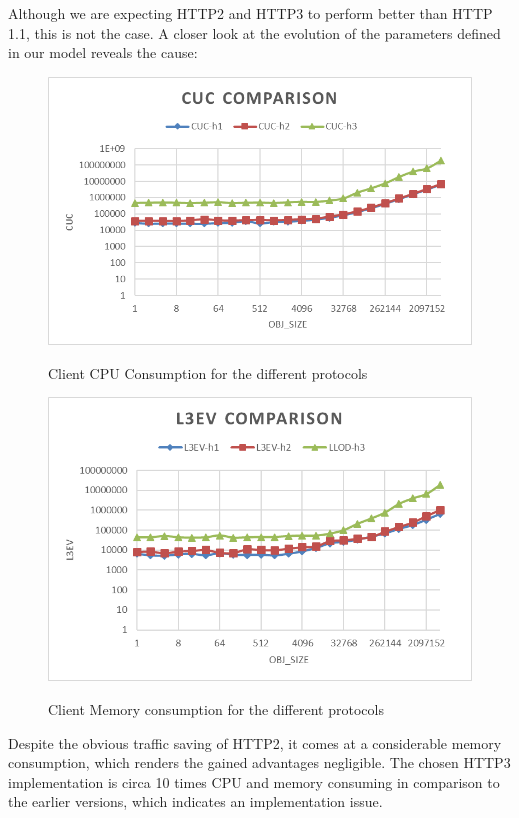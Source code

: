 \documentclass[runningheads]{llncs}
\begin{document}
Although we are expecting HTTP2 and HTTP3 to perform better than HTTP 1.1, this is not the case. A closer look at the evolution of the parameters defined in our model reveals the cause:
\begin{figure}
    \centering
    \begin{minipage}{0.49\textwidth}
        \centering
        \includegraphics[width=1\textwidth]{cuc-h2load-mistral.png}\vspace{-1em}
        \caption{Client CPU Consumption for the different protocols}\vspace{-1.5em}
		\label {fig:cuc-comp}
    \end{minipage}\hfill
    \begin{minipage}{0.49\textwidth}
        \centering
        \includegraphics[width=1\textwidth]{l3ev-h2load-mistral.png}\vspace{-1em}
        \caption{Client Memory consumption for the different protocols}\vspace{-1.5em}
		\label {fig:llod-comp}
    \end{minipage}
\end{figure}
Despite the obvious traffic saving of HTTP2, it comes at a considerable memory consumption, which renders the gained advantages negligible. The chosen HTTP3 implementation is circa 10 times CPU and memory consuming in comparison to the earlier versions, which indicates an implementation issue.
\end{document}
